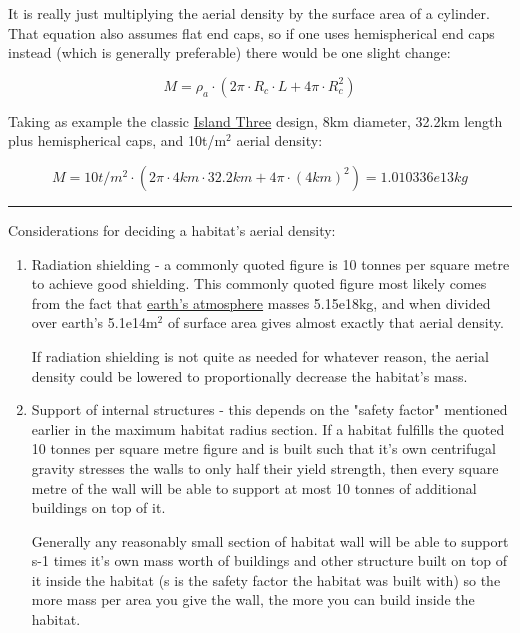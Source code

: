 \documentclass[a4paper]{article}
\begin{document}
	It is really just multiplying the aerial density by the surface area of a cylinder. That equation also assumes flat end caps, so if one uses hemispherical end caps instead (which is generally preferable) there would be one slight change:
	
	$$ M = \rho_a \cdot (2\pi \cdot R_c \cdot L + 4 \pi \cdot R_c^2) $$
	
	\medskip
	
	Taking as example the classic \href{https://en.wikipedia.org/wiki/O%27Neill_cylinder#Islands}{Island Three} design, 8km diameter, 32.2km length plus hemispherical caps, and 10t/m$^2$ aerial density:
	
	$$ M = 10t/m^2 \cdot (2\pi \cdot 4km \cdot 32.2km + 4\pi \cdot (4km)^2) =  1.010336e13kg $$
	
	\noindent \rule{\linewidth}{1pt}
	
	\medskip
	
	Considerations for deciding a habitat's aerial density:
	
	\begin{enumerate}
		\item Radiation shielding - a commonly quoted figure is 10 tonnes per square metre to achieve good shielding. This commonly quoted figure most likely comes from the fact that \href{https://en.wikipedia.org/wiki/Atmosphere_of_Earth}{earth's atmosphere} masses 5.15e18kg, and when divided over earth's 5.1e14m$^2$ of surface area gives almost exactly that aerial density.
		
		\medskip
		
		If radiation shielding is not quite as needed for whatever reason, the aerial density could be lowered to proportionally decrease the habitat's mass.
		
		\item Support of internal structures - this depends on the "safety factor" mentioned earlier in the maximum habitat radius section. If a habitat fulfills the quoted 10 tonnes per square metre figure and is built such that it's own centrifugal gravity stresses the walls to only half their yield strength, then every square metre of the wall will be able to support at most 10 tonnes of additional buildings on top of it.
		
		\medskip
		
		Generally any reasonably small section of habitat wall will be able to support s-1 times it's own mass worth of buildings and other structure built on top of it inside the habitat (s is the safety factor the habitat was built with) so the more mass per area you give the wall, the more you can build inside the habitat.
	\end{enumerate}
	
\end{document}
